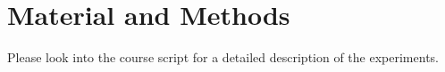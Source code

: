 \section{Material and Methods}
Please look into the course script for a detailed description of the experiments. \cite{Kursskript} \\\\
\newpage
